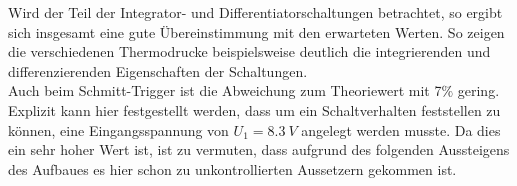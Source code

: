 Wird der Teil der Integrator- und Differentiatorschaltungen betrachtet, so ergibt sich insgesamt eine gute Übereinstimmung mit den erwarteten Werten. So zeigen die verschiedenen Thermodrucke beispielsweise deutlich die integrierenden und differenzierenden Eigenschaften der Schaltungen.\\
Auch beim Schmitt-Trigger ist die Abweichung zum Theoriewert mit 7$\%$ gering. Explizit kann hier festgestellt werden, dass um ein Schaltverhalten feststellen zu können, eine Eingangsspannung von $U_1=\SI{8,3}{V}$ angelegt werden musste. Da dies ein sehr hoher Wert ist, ist zu vermuten, dass aufgrund des folgenden Aussteigens des Aufbaues es hier schon zu unkontrollierten Aussetzern gekommen ist.
